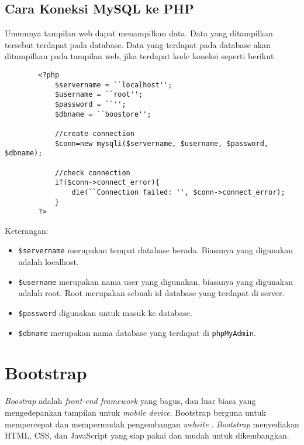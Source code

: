 		
\subsection{Cara Koneksi MySQL ke PHP}
\label{sec:koneksi}
		
Umumnya tampilan web dapat menampilkan data. Data yang ditampilkan tersebut terdapat pada database. Data yang terdapat pada database akan ditampilkan pada tampilan web, jika terdapat kode koneksi seperti berikut.


	\begin{lstlisting}
		<?php
			$servername = ``localhost'';
			$username = ``root'';
			$password = ``'';
			$dbname = ``boostore'';
			
			//create connection
			$conn=new mysqli($servername, $username, $password, $dbname);
			
			//check connection
			if($conn->connect_error){
				die(``Connection failed: '', $conn->connect_error);
			}
		?>
	\end{lstlisting}	

Keterangan:
\begin{itemize}
	\item	\texttt{\$servername} merupakan tempat database berada. Biasanya yang digunakan adalah localhost.
	\item \texttt{\$username} merupakan nama user yang digunakan, biasanya yang digunakan adalah root. Root merupakan sebuah id database yang terdapat di server.
	\item \texttt{\$password} digunakan untuk masuk ke database.
	\item \texttt{\$dbname} merupakan nama database yang terdapat di \texttt{phpMyAdmin}.
\end{itemize}



\section{Bootstrap}
\label{sec:bootstrap}		
		\textit{Boostrap} adalah \textit{front-end framework} yang bagus, dan luar biasa yang mengedepankan tampilan untuk \textit{mobile device}. Bootstrap berguna untuk mempercepat dan mempermudah pengembangan \textit{website} \cite{bootstrap1}. \textit{Bootstrap} menyediakan HTML, CSS, dan JavaScript yang siap pakai dan mudah untuk dikembangkan.
		
